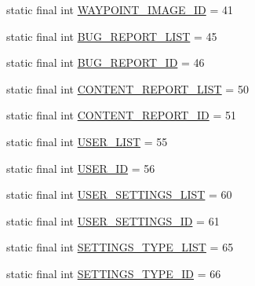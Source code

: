 \begin{DoxyCompactItemize}
\item 
static final int \hyperlink{classuk_1_1ac_1_1swan_1_1digitaltrails_1_1database_1_1_white_rock_content_provider_a75690c85eb00311e582b1d7a6398c1b7}{W\+A\+Y\+P\+O\+I\+N\+T\+\_\+\+I\+M\+A\+G\+E\+\_\+\+I\+D} = 41
\item 
static final int \hyperlink{classuk_1_1ac_1_1swan_1_1digitaltrails_1_1database_1_1_white_rock_content_provider_aa2196c98c95653c1feff9189bc087c0b}{B\+U\+G\+\_\+\+R\+E\+P\+O\+R\+T\+\_\+\+L\+I\+S\+T} = 45
\item 
static final int \hyperlink{classuk_1_1ac_1_1swan_1_1digitaltrails_1_1database_1_1_white_rock_content_provider_a0c9d73ead8fa3e8a459398ef49f7e5a9}{B\+U\+G\+\_\+\+R\+E\+P\+O\+R\+T\+\_\+\+I\+D} = 46
\item 
static final int \hyperlink{classuk_1_1ac_1_1swan_1_1digitaltrails_1_1database_1_1_white_rock_content_provider_a5f0d54d19e3af999ebaa1973c229438e}{C\+O\+N\+T\+E\+N\+T\+\_\+\+R\+E\+P\+O\+R\+T\+\_\+\+L\+I\+S\+T} = 50
\item 
static final int \hyperlink{classuk_1_1ac_1_1swan_1_1digitaltrails_1_1database_1_1_white_rock_content_provider_a4cf12c78e7d5b571b67f3f0ad86c256c}{C\+O\+N\+T\+E\+N\+T\+\_\+\+R\+E\+P\+O\+R\+T\+\_\+\+I\+D} = 51
\item 
static final int \hyperlink{classuk_1_1ac_1_1swan_1_1digitaltrails_1_1database_1_1_white_rock_content_provider_abc90e2c396d119d0b14de1a5d897a823}{U\+S\+E\+R\+\_\+\+L\+I\+S\+T} = 55
\item 
static final int \hyperlink{classuk_1_1ac_1_1swan_1_1digitaltrails_1_1database_1_1_white_rock_content_provider_a6ee8c508cbee0e42aa763843a8042c4e}{U\+S\+E\+R\+\_\+\+I\+D} = 56
\item 
static final int \hyperlink{classuk_1_1ac_1_1swan_1_1digitaltrails_1_1database_1_1_white_rock_content_provider_adf95750260c445fc06b6803b9e7f0790}{U\+S\+E\+R\+\_\+\+S\+E\+T\+T\+I\+N\+G\+S\+\_\+\+L\+I\+S\+T} = 60
\item 
static final int \hyperlink{classuk_1_1ac_1_1swan_1_1digitaltrails_1_1database_1_1_white_rock_content_provider_a9f8c969ba8e543e8f265bad0a5780f16}{U\+S\+E\+R\+\_\+\+S\+E\+T\+T\+I\+N\+G\+S\+\_\+\+I\+D} = 61
\item 
static final int \hyperlink{classuk_1_1ac_1_1swan_1_1digitaltrails_1_1database_1_1_white_rock_content_provider_a381eb074875f554185cc3492947ff03e}{S\+E\+T\+T\+I\+N\+G\+S\+\_\+\+T\+Y\+P\+E\+\_\+\+L\+I\+S\+T} = 65
\item 
static final int \hyperlink{classuk_1_1ac_1_1swan_1_1digitaltrails_1_1database_1_1_white_rock_content_provider_a0e735f2f76d7e42dfb3381bff86d54e3}{S\+E\+T\+T\+I\+N\+G\+S\+\_\+\+T\+Y\+P\+E\+\_\+\+I\+D} = 66

\end{DoxyCompactItemize}
